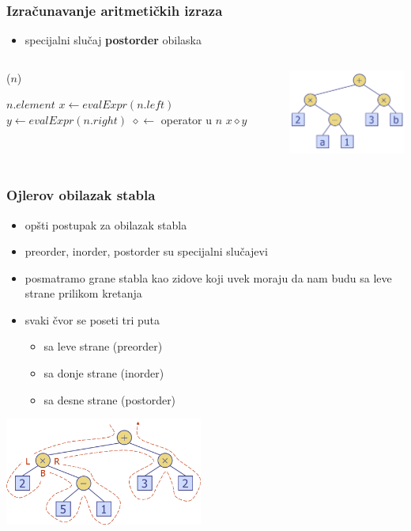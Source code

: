 \documentclass[compress,aspectratio=169]{beamer}
\begin{document}
\begin{frame}[fragile]
  \frametitle{Izračunavanje aritmetičkih izraza}
  \begin{itemize}
    \item specijalni slučaj \textbf{postorder} obilaska
  \end{itemize}
\begin{columns}
  \begin{column}[c]{5cm}
    ($n$)
    \begin{algorithmic}
      \RETURN $n$.$element$
    \ELSE
      \STATE $x \leftarrow evalExpr(n.left)$
      \STATE $y \leftarrow evalExpr(n.right)$
      \STATE $\diamond \leftarrow$ operator u $n$
      \RETURN $x \diamond y$
    \ENDIF
    \end{algorithmic}
  \end{column}
  \begin{column}[c]{6cm}
    \begin{center}
      \includegraphics[width=6cm]{asp-08-pic10.png}
    \end{center}
  \end{column}
\end{columns}
\end{frame}

\begin{frame}[fragile]
  \frametitle{Ojlerov obilazak stabla}
  \begin{itemize}
    \item opšti postupak za obilazak stabla
    \item preorder, inorder, postorder su specijalni slučajevi
    \item posmatramo grane stabla kao zidove koji uvek moraju da nam budu sa leve strane prilikom kretanja
    \item svaki čvor se poseti tri puta
    \begin{itemize}
      \item sa leve strane (preorder)
      \item sa donje strane (inorder)
      \item sa desne strane (postorder)
    \end{itemize}
  \end{itemize}
  \begin{center}
    \includegraphics[width=6.5cm]{asp-08-pic17.png}
  \end{center}
\end{frame}
\end{document}
